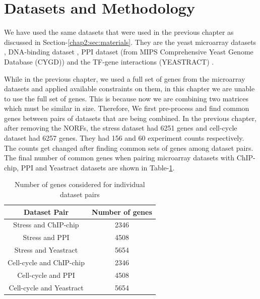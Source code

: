 \section{Datasets and Methodology} \label{chap3:sec:materials}

We have used the same datasets that were used in the previous chapter as discussed in Section-\ref{chap2:sec:materials}. They are the yeast microarray 
datasets \citep{gasch00genomicexpn,spellman98comprehensive}, DNA-binding dataset \citep{harbison04transcriptional}, 
PPI dataset (from MIPS Comprehensive Yeast Genome Database (CYGD)) \citep{Gueldener2006MPact} and the TF-gene interactions (YEASTRACT) \citep{Teixeira06yeastract}. 

While in the previous chapter, we used a full set of genes from the microarray datasets and applied available constraints on them, in this chapter we are unable to use 
the full set of genes. This is because now we are combining two matrices which must be similar in size. Therefore, We first pre-process and find common genes between 
pairs of datasets that are being combined. In the previous chapter, after removing the NORFs, the stress dataset had 6251 genes and cell-cycle dataset had 6257 genes. 
They had 156 and 60 experiment counts respectively. The counts get changed after finding common sets of genes among dataset pairs. The final number of common genes when pairing 
microarray datasets with ChIP-chip, PPI and Yeastract datasets are shown in Table-\ref{tab:datasetpair_commongenes}.  
 
\begin{table}
\centering
\begin{tabular}{|c|c|}
\hline
Dataset Pair & Number of genes \\ 
\hline
Stress and ChIP-chip & 2346 \\
Stress and PPI       & 4508 \\
Stress and Yeastract  & 5654 \\
\hline 
Cell-cycle and ChIP-chip & 2346\\
Cell-cycle and PPI       & 4508\\
Cell-cycle and Yeastract  & 5654\\
\hline
\end{tabular}
\caption{Number of genes considered for individual dataset pairs}
\label{tab:datasetpair_commongenes}
\end{table}

